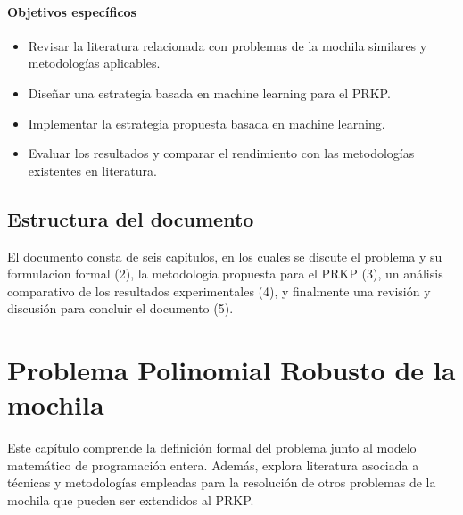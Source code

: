 \documentclass[spanish, a4paper, 12pt, openany,final]{book}
\begin{document}
\subsubsection*{Objetivos específicos}
\begin{itemize}
	\item Revisar la literatura relacionada con problemas de la mochila similares y metodologías aplicables.
	\item Diseñar una estrategia basada en machine learning para el PRKP.
	\item Implementar la estrategia propuesta basada en machine learning.
	\item Evaluar los resultados y comparar el rendimiento con las metodologías existentes en literatura.
\end{itemize}

\section{Estructura del documento}

El documento consta de seis capítulos, en los cuales se discute el problema y su formulacion formal (2), la metodología propuesta para el PRKP (3), un análisis comparativo de los resultados experimentales (4), y finalmente una revisión y discusión para concluir el documento (5).

\clearpage

\chapter{Problema Polinomial Robusto de la mochila}
Este capítulo comprende la definición formal del problema junto al modelo matemático de programación entera. Además, explora literatura asociada a técnicas y metodologías empleadas para la resolución de otros problemas de la mochila que pueden ser extendidos al PRKP.
\end{document}
